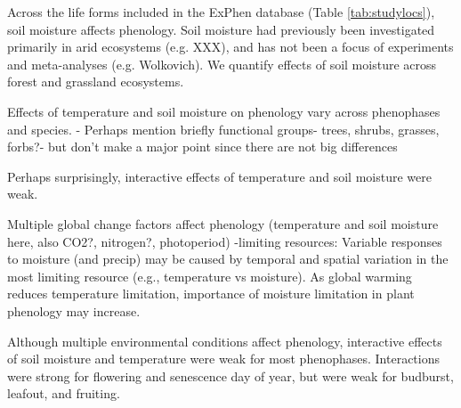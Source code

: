 \documentclass{article}
\begin{document}
\par  Across the life forms included in the ExPhen database (Table \ref{tab:studylocs}), soil moisture affects phenology. Soil moisture had previously been investigated primarily in arid ecosystems (e.g. XXX), and has not been a focus of experiments and meta-analyses (e.g. Wolkovich). We quantify effects of soil moisture across forest and grassland ecosystems.

\par Effects of temperature and soil moisture on phenology vary across phenophases and species.
- Perhaps mention briefly functional groups- trees, shrubs, grasses, forbs?- but don't make a major point since there are not big differences

\par Perhaps surprisingly, interactive effects of temperature and soil moisture were weak.

\par Multiple global change factors affect phenology (temperature and soil moisture here, also CO2?, nitrogen?, photoperiod)
 -limiting resources: Variable responses to moisture (and precip) may be caused by temporal and spatial variation in the most limiting resource (e.g., temperature vs moisture). As global warming reduces temperature limitation, importance of moisture limitation in plant phenology may increase. 

\par Although multiple environmental conditions affect phenology,  interactive effects of soil moisture and temperature were weak for most phenophases. Interactions were strong for flowering and senescence day of year, but were weak for budburst, leafout, and fruiting. 
\end{document}
